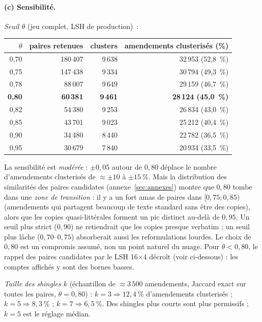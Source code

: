 \documentclass[11pt,a4paper]{article}
\begin{document}
\paragraph{(c) Sensibilité.}
\emph{Seuil $\theta$} (jeu complet, LSH de production)~:
\begin{center}\small
\begin{tabular}{rrrr}
\toprule
$\theta$ & paires retenues & clusters & amendements clusterisés (\%) \\
\midrule
0,70 & 180\,407 & 9\,638 & 32\,953 \;(52,8~\%) \\
0,75 & 147\,438 & 9\,334 & 30\,794 \;(49,3~\%) \\
0,78 & \phantom{0}88\,007 & 9\,649 & 29\,159 \;(46,7~\%) \\
\textbf{0,80} & \phantom{0}\textbf{60\,381} & \textbf{9\,461} & \textbf{28\,124 \;(45,0~\%)} \\
0,82 & \phantom{0}54\,380 & 9\,253 & 26\,834 \;(43,0~\%) \\
0,85 & \phantom{0}43\,701 & 9\,023 & 25\,212 \;(40,4~\%) \\
0,90 & \phantom{0}34\,480 & 8\,440 & 22\,782 \;(36,5~\%) \\
0,95 & \phantom{0}30\,679 & 7\,840 & 20\,934 \;(33,5~\%) \\
\bottomrule
\end{tabular}
\end{center}
La sensibilité est \emph{modérée} : $\pm0{,}05$ autour de $0{,}80$ déplace le nombre
d'amendements clusterisés de $\approx \pm10$ à $\pm15~\%$. Mais la distribution des
similarités des paires candidates (annexe~\ref{sec:annexes}) montre que $0{,}80$
tombe dans une \emph{zone de transition} : il y a un fort amas de paires dans
$[0{,}75;0{,}85)$ (amendements qui partagent beaucoup de texte standard sans être
des copies), alors que les copies quasi-littérales forment un pic distinct au-delà
de $0{,}95$. Un seuil plus strict ($0{,}90$) ne retiendrait que les copies presque
verbatim ; un seuil plus lâche ($0{,}70$--$0{,}75$) absorberait aussi les
reformulations lourdes. Le choix de $0{,}80$ est un compromis assumé, non un point
\og{}naturel\fg{} du nuage. Pour $\theta<0{,}80$, le rappel des paires candidates
par le LSH 16$\times$4 décroît (voir ci-dessous) : les comptes affichés y sont des
bornes basses.

\emph{Taille des shingles $k$} (échantillon de $\approx 3\,500$ amendements,
Jaccard exact sur toutes les paires, $\theta=0{,}80$) : $k=3 \Rightarrow 12{,}4~\%$
d'amendements clusterisés ; $k=5 \Rightarrow 8{,}3~\%$ ; $k=7 \Rightarrow 6{,}5~\%$.
Des shingles plus courts sont plus permissifs ; $k=5$ est le réglage médian.
\end{document}
